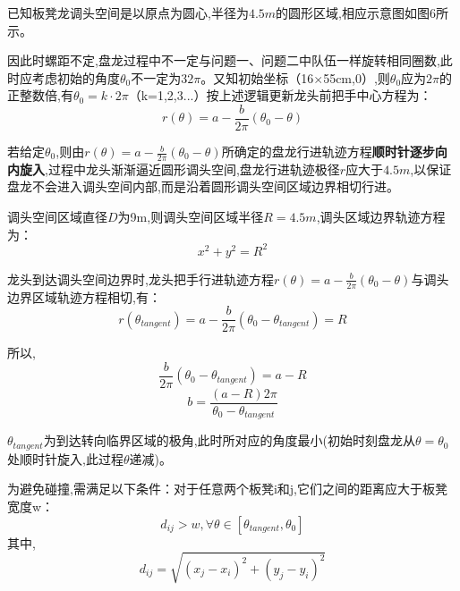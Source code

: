 
已知板凳龙调头空间是以原点为圆心,半径为$4.5m$的圆形区域,相应示意图如图6所示。



因此时螺距不定,盘龙过程中不一定与问题一、问题二中队伍一样旋转相同圈数,此时应考虑初始的角度$\theta_{0}$不一定为$32\pi$。又知初始坐标（16$\times$55cm,0）,则$\theta_{0}$应为$2\pi$的正整数倍,有$\theta_0 = k \cdot 2\pi$（k=1,2,3...）按上述逻辑更新龙头前把手中心方程为：
\begin{equation}
	r(\theta)=a-\frac{b}{2\pi}(\theta_0-\theta)
\end{equation}

若给定$\theta_{0}$,则由$r(\theta)=a-\frac{b}{2\pi}(\theta_0-\theta)$所确定的盘龙行进轨迹方程\textbf{顺时针逐步向内旋入},过程中龙头渐渐逼近圆形调头空间,盘龙行进轨迹极径$r$应大于$4.5m$,以保证盘龙不会进入调头空间内部,而是沿着圆形调头空间区域边界相切行进。

调头空间区域直径$D$为9m,则调头空间区域半径$R=4.5m$,调头区域边界轨迹方程为：
\begin{equation}
	x^{2}+y^{2} = R^{2}
\end{equation}

龙头到达调头空间边界时,龙头把手行进轨迹方程$r(\theta)=a-\frac{b}{2\pi}(\theta_0-\theta)$与调头边界区域轨迹方程相切,有：
\begin{equation}
	r(\theta_{tangent}) = a-\frac{b}{2\pi}(\theta_0 - \theta_{tangent}) = R
\end{equation}

所以,
\begin{equation}
	\frac{b}{2\pi}(\theta_0-\theta_{tangent}) = a - R
\end{equation}
\begin{equation}
	b = \frac{(a - R)2\pi}{\theta_0-\theta_{tangent}} 
\end{equation}

$\theta_{tangent}$为到达转向临界区域的极角,此时所对应的角度最小(初始时刻盘龙从$\theta = \theta_0$ 处顺时针旋入,此过程$\theta$递减)。

为避免碰撞,需满足以下条件：对于任意两个板凳i和j,它们之间的距离应大于板凳宽度w：
\begin{equation}
	d_{ij} > w, \forall \theta \in [\theta_{tangent}, \theta_0]
\end{equation}
其中,
\begin{equation}
	d_{ij}=\sqrt{(x_j-x_i)^2+(y_j-y_i)^2}
\end{equation}

